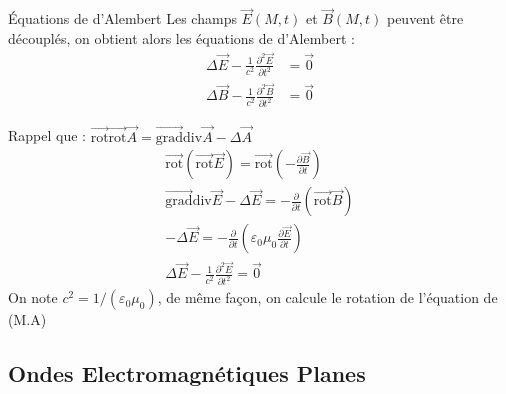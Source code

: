 \begin{Prop}{Équations de d'Alembert}{}
Les champs $\overrightarrow{E} (M,t)$ et $\overrightarrow{B} (M,t)$ peuvent être découplés, on obtient alors les équations de d'Alembert :
\begin{align*}
    \Delta \overrightarrow{E}  - \frac{1}{c^{2}} \frac{\partial ^{2}\overrightarrow{E} }{\partial t^{2}}  &= \overrightarrow{0} \\
    \Delta \overrightarrow{B}  - \frac{1}{c^{2}} \frac{\partial ^{2}\overrightarrow{B} }{\partial t^{2}}  &= \overrightarrow{0}
\end{align*}
\end{Prop}

\begin{myproof} Rappel que : $\overrightarrow{\mathrm{rot}}\overrightarrow{\mathrm{rot}}\overrightarrow{A} = \overrightarrow{\mathrm{grad}}\mathrm{div}\overrightarrow{A} - \Delta \overrightarrow{A}$
\begin{gather*}
    \overrightarrow{\mathrm{rot} } (\overrightarrow{\mathrm{rot} } \overrightarrow{E}) = \overrightarrow{\mathrm{rot} } \left( - \frac{\partial \overrightarrow{B} }{\partial t}  \right)  \\
\overrightarrow{\mathrm{grad} } \mathrm{div} \overrightarrow{E}  - \Delta \overrightarrow{E}  = - \frac{\partial }{\partial t} (\overrightarrow{\mathrm{rot} } \overrightarrow{B} )\\
-\Delta \overrightarrow{E}  = - \frac{\partial }{\partial t} \left( \varepsilon_0 \mu_0 \frac{\partial \overrightarrow{E} }{\partial t}  \right)  \\
    \Delta \overrightarrow{E}  - \frac{1}{c^{2}} \frac{\partial ^{2}\overrightarrow{E} }{\partial t^{2}}  = \overrightarrow{0}
\end{gather*}
On note $c^{2} = 1 / (\varepsilon_0 \mu_0)$, de même façon, on calcule le rotation de l'équation de (M.A)
\end{myproof}

\subsection{Ondes Electromagnétiques Planes}

